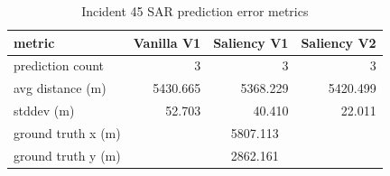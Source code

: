 \begin{table}[ht]
\centering
\caption{Incident 45 SAR prediction error metrics}
\label{tab:sar-incident-45}
\begin{tabular}{lrrr}
\hline
metric & Vanilla V1 & Saliency V1 & Saliency V2 \\
\hline
prediction count & 3 & 3 & 3 \\
avg distance (m) & 5430.665 & 5368.229 & 5420.499 \\
stddev (m) & 52.703 & 40.410 & 22.011 \\
ground truth x (m) & \multicolumn{3}{c}{5807.113} \\
ground truth y (m) & \multicolumn{3}{c}{2862.161} \\
\hline
\end{tabular}
\end{table}
